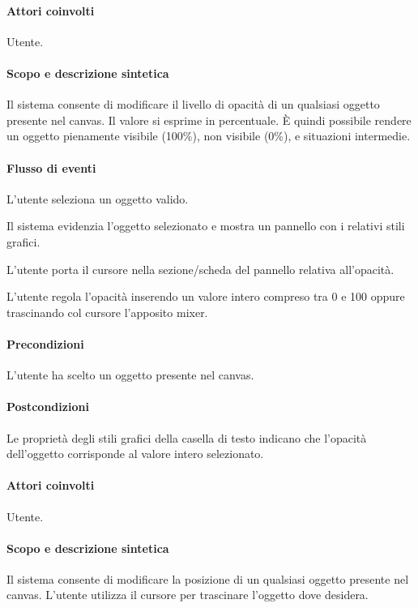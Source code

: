 \paragraph{Attori coinvolti} Utente.
\paragraph{Scopo e descrizione sintetica}  Il sistema consente di modificare il livello di opacit\` a di un qualsiasi oggetto presente nel canvas. Il valore si esprime in percentuale.   \` E quindi possibile rendere un oggetto pienamente visibile (100\%), non visibile (0\%), e situazioni intermedie.
\paragraph{Flusso di eventi}
\begin{elenconumerato}[\textbf{}]{\subsubsecindent}
\item L'utente seleziona un oggetto valido.
\item Il sistema evidenzia l'oggetto selezionato e mostra un pannello con i relativi stili grafici.
\item L'utente porta  il cursore nella sezione/scheda del pannello relativa all'opacit\` a.
\item L'utente regola l'opacit\` a inserendo un valore intero compreso tra 0 e 100 oppure trascinando col cursore l'apposito mixer.
\end{elenconumerato}
\paragraph{Precondizioni} L'utente ha scelto un oggetto presente nel canvas.
\paragraph{Postcondizioni} Le propriet\` a degli stili grafici della casella di testo indicano che l'opacit\` a dell'oggetto corrisponde al valore intero selezionato.

\paragraph{Attori coinvolti} Utente.
\paragraph{Scopo e descrizione sintetica} Il sistema consente di modificare la posizione di un qualsiasi oggetto presente nel canvas. L'utente utilizza il cursore per trascinare l'oggetto dove desidera.
